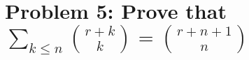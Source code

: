 ﻿\section{Problem 5: Prove that $\sum_{k \leq n} \binom{r+k}{k} = \binom{r+n+1}{n}$}
\label{sec:problem-5:-concrete-mathematics-5.9}
